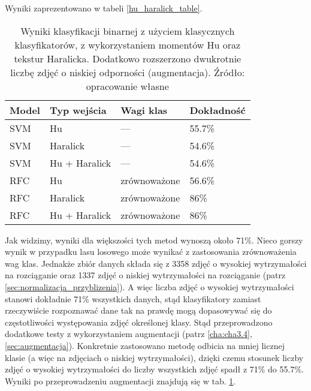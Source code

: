 Wyniki zaprezentowano w tabeli \ref{hu_haralick_table}.
\begin{table}[h]
	\centering
	\begin{threeparttable}
		\caption{Wyniki klasyfikacji binarnej z użyciem klasycznych klasyfikatorów, z wykorzystaniem momentów Hu oraz tekstur Haralicka. Dodatkowo rozszerzono dwukrotnie liczbę zdjęć o niskiej odporności (augmentacja). Źródło: opracowanie własne}
		\label{hu_haralick_table_with_augmentation}
		\begin{tabularx}{1\textwidth}{ |X|X|X|X| }
		  \hline
		  \textbf{Model} & \textbf{Typ wejścia} & \textbf{Wagi klas} & \textbf{Dokładność}\\

		  \hline
		  SVM & Hu & — & 55.7\%\\

		  \hline
		  SVM & Haralick & — & 54.6\%\\

		  \hline
		  SVM & Hu + Haralick & — & 54.6\%\\

		  \hline
		  RFC & Hu & zrównoważone & 56.6\%\\

		  \hline
  		  RFC & Haralick & zrównoważone & 86\%\\
  		  
		  \hline
  		  RFC & Hu + Haralick & zrównoważone & 86\%\\
  		  
		  \hline
		\end{tabularx}
	\end{threeparttable}
\end{table}
Jak widzimy, wyniki dla większości tych metod wynoszą około 71\%. Nieco gorszy wynik w przypadku lasu losowego może wynikać z zastosowania zrównoważenia wag klas. Jednakże zbiór danych składa się z 3358 zdjęć o wysokiej wytrzymałości na rozciąganie oraz 1337 zdjęć o niskiej wytrzymałości na rozciąganie (patrz \ref{sec:normalizacja_przyblizenia}). A więc liczba zdjęć o wysokiej wytrzymałości stanowi dokładnie 71\% wszystkich danych, stąd klasyfikatory zamiast rzeczywiście rozpoznawać dane tak na prawdę mogą dopasowywać się do częstotliwości występowania zdjęć określonej klasy. Stąd przeprowadzono dodatkowe testy z wykorzystaniem augmentacji (patrz \ref{cha:cha3.4}, \ref{sec:augmentacja}). Konkretnie zastosowano metodę odbicia na mniej licznej klasie (a więc na zdjęciach o niskiej wytrzymałości), dzięki czemu stosunek liczby zdjęć o wysokiej wytrzymałości do liczby wszystkich zdjęć spadł z 71\% do 55.7\%. Wyniki po przeprowadzeniu augmentacji znajdują się w tab. \ref{hu_haralick_table_with_augmentation}.
